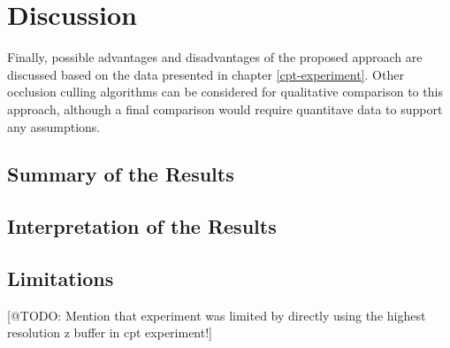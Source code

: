 \chapter{Discussion} \label{cpt-discussion}


Finally, possible advantages and disadvantages of the proposed approach are discussed based on the data
presented in chapter \ref{cpt-experiment}. Other occlusion culling algorithms can be considered for 
qualitative comparison to this approach, although a final comparison would require quantitave data to 
support any assumptions.\\


\section{Summary of the Results}
\section{Interpretation of the Results}
\section{Limitations}

[@TODO: Mention that experiment was limited by directly using the highest resolution z buffer in cpt experiment!]


%
%
%
